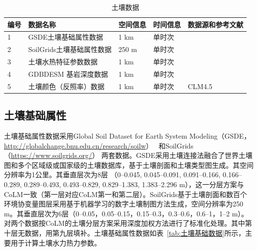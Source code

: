 \begin{table}[htbp]
  \begin{threeparttable}
    \centering
    \caption{土壤数据}
    \label{tab:土壤数据}
    \begin{tabular}{p{1cm}p{5.5cm}p{2cm}p{2cm}p{3.5cm}}
      \toprule
      编号 & 数据名称                  & 空间信息 & 时间信息 & 数据源和参考文献            \\
      \midrule
      1    & GSDE土壤基础属性数据      & 1 km     & 单时次   & \cite{shangguan2014global}  \\
      2    & SoilGrids土壤基础属性数据 & 250 m    & 单时次   & \cite{poggio2021soilgrids}  \\
      3    & 土壤水热特征参数数据      & 1 km     & 单时次   & \cite{dai2019parameters}    \\
      4    & GDBDESM 基岩深度数据      & 1 km     & 单时次   & \cite{shangguan2017mapping} \\
      5    & 土壤颜色（反照率）数据    & 1 km     & 单时次   & CLM4.5                      \\
      \bottomrule
    \end{tabular}
  \end{threeparttable}
\end{table}

\subsection{土壤基础属性}\label{土壤基础属性}
土壤基础属性数据采用Global Soil Dataset for Earth System Modeling（GSDE，\url{http://globalchange.bnu.edu.cn/research/soilw}）~\citep{shangguan2014global}
和SoilGrids（\url{https://www.soilgrids.org/}）\citep{poggio2021soilgrids} 两套数据。GSDE采用土壤连接法融合了世界土壤图和多个区域级或国家级的土壤数据库，基于土壤剖面和土壤类型图生成。其空间分辨率为1公里。其垂直层次为8层 （0--0.045, 0.045--0.091, 0.091--0.166, 0.166--0.289, 0.289--0.493, 0.493--0.829, 0.829--1.383, 1.383--2.296 m），这一分层方案与CoLM一致（第一层对应CoLM第一和第二层）。SoilGrids基于土壤剖面和数百个环境协变量图层采用基于机器学习的数字土壤制图方法生成，空间分辨率为250 m。其垂直层次为6层（0--0.05，0.05--0.15，0.15--0.3，0.3--0.6，0.6--1，1--2 m）。对两个数据按CoLM的土壤分层方案采用深度加权方法进行了标准化处理。其中第十层无数据，用第九层填补。土壤基础属性数据如表~\ref{tab:土壤基础数据}所示，主要用于计算土壤水力热力参数。

